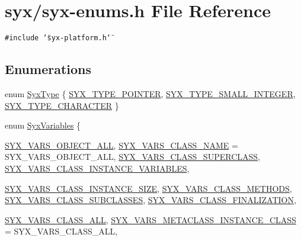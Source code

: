\hypertarget{syx-enums_8h}{
\section{syx/syx-enums.h File Reference}
\label{syx-enums_8h}
}
{\tt \#include \char`\"{}syx-platform.h\char`\"{}}\par
\subsection*{Enumerations}
\begin{CompactItemize}
\item 
enum \hyperlink{syx-enums_8h_995192330090095649af08ee35b6d3fb}{SyxType} \{ \hyperlink{syx-enums_8h_995192330090095649af08ee35b6d3fbef884104793b785b1d75b1b8506996c7}{SYX\_\-TYPE\_\-POINTER}, 
\hyperlink{syx-enums_8h_995192330090095649af08ee35b6d3fb5ae9d9da2e121d223fb44cfe352d5c76}{SYX\_\-TYPE\_\-SMALL\_\-INTEGER}, 
\hyperlink{syx-enums_8h_995192330090095649af08ee35b6d3fbf0754465fdbb710ac130ac233fe28bbd}{SYX\_\-TYPE\_\-CHARACTER}
 \}
\item 
enum \hyperlink{syx-enums_8h_c792ce905d7a570f1bf725aafa4d1d9b}{SyxVariables} \{ \par
\hyperlink{syx-enums_8h_c792ce905d7a570f1bf725aafa4d1d9be7f3e8b29c114cbde70567ad9d9fe113}{SYX\_\-VARS\_\-OBJECT\_\-ALL}, 
\hyperlink{syx-enums_8h_c792ce905d7a570f1bf725aafa4d1d9ba201303c00127fbda4c7dcd135ea6b66}{SYX\_\-VARS\_\-CLASS\_\-NAME} =  SYX\_\-VARS\_\-OBJECT\_\-ALL, 
\hyperlink{syx-enums_8h_c792ce905d7a570f1bf725aafa4d1d9b35f98153de55e464c94cdf0c0af7f7fc}{SYX\_\-VARS\_\-CLASS\_\-SUPERCLASS}, 
\hyperlink{syx-enums_8h_c792ce905d7a570f1bf725aafa4d1d9b0295516eb5b89bfaf14511afa9cf25d8}{SYX\_\-VARS\_\-CLASS\_\-INSTANCE\_\-VARIABLES}, 
\par
\hyperlink{syx-enums_8h_c792ce905d7a570f1bf725aafa4d1d9bab69df12faac43131372db08de4a5be2}{SYX\_\-VARS\_\-CLASS\_\-INSTANCE\_\-SIZE}, 
\hyperlink{syx-enums_8h_c792ce905d7a570f1bf725aafa4d1d9b84b1a1fe86b7b80ee64e924afbd8897b}{SYX\_\-VARS\_\-CLASS\_\-METHODS}, 
\hyperlink{syx-enums_8h_c792ce905d7a570f1bf725aafa4d1d9b00aedca272db60f3b3cba8565b1610ec}{SYX\_\-VARS\_\-CLASS\_\-SUBCLASSES}, 
\hyperlink{syx-enums_8h_c792ce905d7a570f1bf725aafa4d1d9b30e839e835aeae70cf5e48a0d569df83}{SYX\_\-VARS\_\-CLASS\_\-FINALIZATION}, 
\par
\hyperlink{syx-enums_8h_c792ce905d7a570f1bf725aafa4d1d9bcebb58bb3117a18433419dff137931ff}{SYX\_\-VARS\_\-CLASS\_\-ALL}, 
\hyperlink{syx-enums_8h_c792ce905d7a570f1bf725aafa4d1d9b86f662f36463076ce6326c202b3e8807}{SYX\_\-VARS\_\-METACLASS\_\-INSTANCE\_\-CLASS} =  SYX\_\-VARS\_\-CLASS\_\-ALL, 

\end{CompactItemize}
